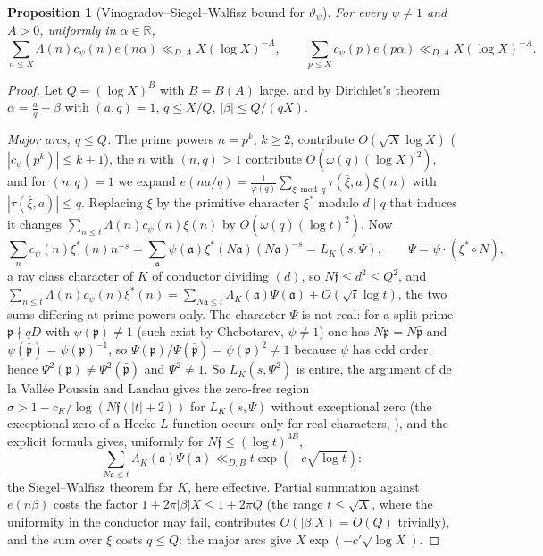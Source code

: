 \documentclass[11pt]{amsart}
\newtheorem{proposition}[theorem]{Proposition}
\theoremstyle{remark}
\newcommand{\vt}{\vartheta}
\begin{document}
\begin{proposition}[Vinogradov--Siegel--Walfisz bound for $\vt_\psi$]\label{prop:VSW}
For every $\psi\ne1$ and $A>0$, uniformly in $\alpha\in\mathbb R$,
\[
\sum_{n\le X}\Lambda(n)c_\psi(n)e(n\alpha)\ll_{D,A}X(\log X)^{-A},\qquad \sum_{p\le X}c_\psi(p)e(p\alpha)\ll_{D,A}X(\log X)^{-A}.
\]
\end{proposition}
\begin{proof}
Let $Q=(\log X)^B$ with $B=B(A)$ large, and by Dirichlet's theorem $\alpha=\frac aq+\beta$ with $(a,q)=1$, $q\le X/Q$, $|\beta|\le Q/(qX)$.

\emph{Major arcs, $q\le Q$.} The prime powers $n=p^k$, $k\ge2$, contribute $O(\sqrt X\log X)$ ($|c_\psi(p^k)|\le k+1$), the $n$ with $(n,q)>1$ contribute $O(\omega(q)(\log X)^2)$, and for $(n,q)=1$ we expand $e(na/q)=\frac1{\varphi(q)}\sum_{\xi\bmod q}\tau(\bar\xi,a)\xi(n)$ with $|\tau(\bar\xi,a)|\le q$. Replacing $\xi$ by the primitive character $\xi^*$ modulo $d\mid q$ that induces it changes $\sum_{n\le t}\Lambda(n)c_\psi(n)\xi(n)$ by $O(\omega(q)(\log t)^2)$. Now
\[
\sum_nc_\psi(n)\xi^*(n)n^{-s}=\sum_{\mathfrak a}\psi(\mathfrak a)\xi^*(N\mathfrak a)(N\mathfrak a)^{-s}=L_K(s,\Psi),\qquad\Psi=\psi\cdot(\xi^*\circ N),
\]
a ray class character of $K$ of conductor dividing $(d)$, so $N\mathfrak f\le d^2\le Q^2$, and $\sum_{n\le t}\Lambda(n)c_\psi(n)\xi^*(n)=\sum_{N\mathfrak a\le t}\Lambda_K(\mathfrak a)\Psi(\mathfrak a)+O(\sqrt t\log t)$, the two sums differing at prime powers only. The character $\Psi$ is not real: for a split prime $\mathfrak p\nmid qD$ with $\psi(\mathfrak p)\ne1$ (such exist by Chebotarev, $\psi\ne1$) one has $N\mathfrak p=N\bar{\mathfrak p}$ and $\psi(\bar{\mathfrak p})=\psi(\mathfrak p)^{-1}$, so $\Psi(\mathfrak p)/\Psi(\bar{\mathfrak p})=\psi(\mathfrak p)^2\ne1$ because $\psi$ has odd order, hence $\Psi^2(\mathfrak p)\ne\Psi^2(\bar{\mathfrak p})$ and $\Psi^2\ne1$. So $L_K(s,\Psi^2)$ is entire, the argument of de la Vall\'ee Poussin and Landau gives the zero-free region $\sigma>1-c_K/\log(N\mathfrak f(|t|+2))$ for $L_K(s,\Psi)$ without exceptional zero (the exceptional zero of a Hecke $L$-function occurs only for real characters, \cite[Chapter~5]{IK}), and the explicit formula gives, uniformly for $N\mathfrak f\le(\log t)^{3B}$,
\[
\sum_{N\mathfrak a\le t}\Lambda_K(\mathfrak a)\Psi(\mathfrak a)\ll_{D,B}t\exp(-c\sqrt{\log t}):
\]
the Siegel--Walfisz theorem for $K$, here effective. Partial summation against $e(n\beta)$ costs the factor $1+2\pi|\beta|X\le1+2\pi Q$ (the range $t\le\sqrt X$, where the uniformity in the conductor may fail, contributes $O(|\beta|X)=O(Q)$ trivially), and the sum over $\xi$ costs $q\le Q$: the major arcs give $X\exp(-c'\sqrt{\log X})$.


\end{proof}
\end{document}
